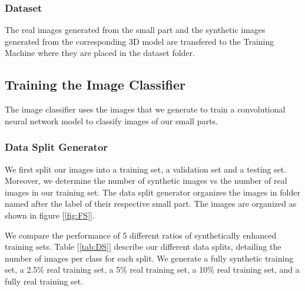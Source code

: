 \subsubsection{Dataset}
The real images generated from the small part and the synthetic images generated from the corresponding 3D model are transfered to the Training Machine where they are placed in the dataset folder.

\subsection{Training the Image Classifier}
The image classifier uses the images that we generate to train a convolutional neural network model to classify images of our small parts.

\subsubsection{Data Split Generator}
We first split our images into a training set, a validation set and a testing set. Moreover, we determine the number of synthetic images vs the number of real images in our training set. The data split generator organizes the images in folder named after the label of their respective small part. The images are organized as shown in figure [\ref{fig:FS}].

We compare the performance of 5 different ratios of synthetically enhanced training sets. Table [\ref{tab:DS}] describe our different data splits, detailing the number of images per class for each split. We generate a fully synthetic training set, a 2.5\% real training set, a 5\% real training set, a 10\% real training set, and a fully real training set. 

